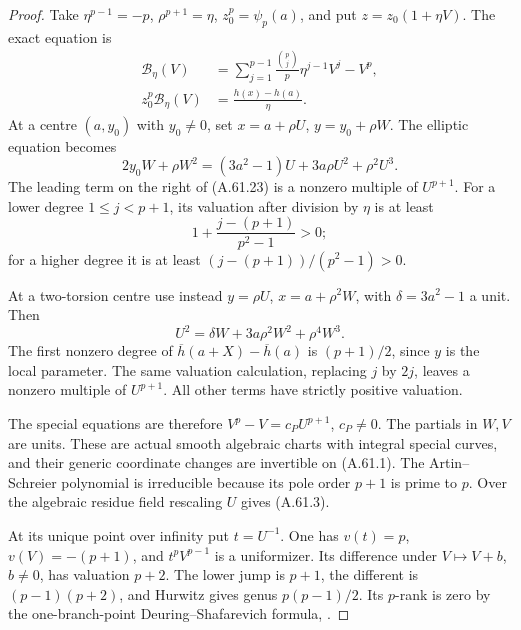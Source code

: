\begin{proof}
Take \(\eta^{p-1}=-p\), \(\rho^{p+1}=\eta\),
\(z_0^p=\psi_p(a)\), and put
\(z=z_0(1+\eta V)\). The exact equation is
\[
 \begin{aligned}
 \mathcal B_\eta(V)
    &=\sum_{j=1}^{p-1}\frac{\binom pj}{p}
                       \eta^{j-1}V^j-V^p,\\
 z_0^p\mathcal B_\eta(V)
    &=\frac{h(x)-h(a)}{\eta}.                          \tag{A.61.23}
 \end{aligned}
\]
At a centre \((a,y_0)\) with \(y_0\ne0\), set
\(x=a+\rho U\), \(y=y_0+\rho W\). The elliptic
equation becomes
\[
 2y_0W+\rho W^2
             =(3a^2-1)U+3a\rho U^2+\rho^2U^3.         \tag{A.61.24}
\]
The leading term on the right of (A.61.23) is
a nonzero multiple of \(U^{p+1}\).
For a lower degree \(1\le j<p+1\), its valuation
after division by \(\eta\) is at least
\[
                   1+\frac{j-(p+1)}{p^2-1}>0;
                                                        \tag{A.61.25}
\]
for a higher degree it is at least
\((j-(p+1))/(p^2-1)>0\).

At a two-torsion centre use instead
\(y=\rho U\), \(x=a+\rho^2W\), with
\(\delta=3a^2-1\) a unit. Then
\[
                 U^2=\delta W+3a\rho^2W^2+\rho^4W^3.
                                                        \tag{A.61.26}
\]
The first nonzero degree of
\(\overline h(a+X)-\overline h(a)\) is
\((p+1)/2\), since \(y\) is the local parameter.
The same valuation calculation, replacing \(j\)
by \(2j\), leaves a nonzero multiple of
\(U^{p+1}\). All other terms have strictly
positive valuation.

The special equations are therefore
\(V^p-V=c_PU^{p+1}\), \(c_P\ne0\).
The partials in \(W,V\) are units. These are
actual smooth algebraic charts with integral
special curves, and their generic coordinate
changes are invertible on (A.61.1). The
Artin--Schreier polynomial is irreducible because
its pole order \(p+1\) is prime to \(p\).
Over the algebraic residue field rescaling
\(U\) gives (A.61.3).

At its unique point over infinity put \(t=U^{-1}\).
One has \(v(t)=p\), \(v(V)=-(p+1)\), and
\(t^pV^{p-1}\) is a uniformizer. Its difference
under \(V\mapsto V+b\), \(b\ne0\), has
valuation \(p+2\). The lower jump is \(p+1\),
the different is \((p-1)(p+2)\), and Hurwitz
gives genus \(p(p-1)/2\). Its \(p\)-rank is
zero by the one-branch-point Deuring--Shafarevich
formula, \cite[Corollary 1.8]{fghCrew1984}.


\end{proof}
